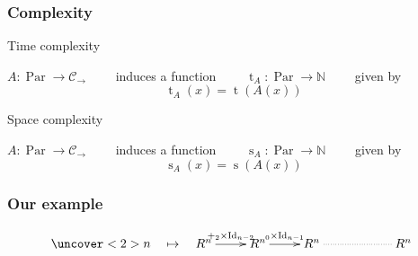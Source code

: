 \documentclass[10pt]{beamer}
\newcommand{\cat}[1]{\mathscr{#1}}
\newcommand{\C}{\cat{C}}
\DeclareMathOperator{\Id}{Id}
\newcommand{\N}{\mathbb{N}}
\newcommand{\ra}{\rightarrow}
\DeclareMathOperator{\Time}{t}
\DeclareMathOperator{\Space}{s}
\DeclareMathOperator{\Par}{Par}
\begin{document}
\begin{frame}
  \frametitle{Complexity}

  \begin{block}{Time complexity}
    \begin{center}
      $A:\Par\ra\C_\ra\qquad$ induces a function
      $\qquad\Time_A:\Par\ra\N\qquad$ given by
      \[\Time_A(x) = \Time(A(x))\]
    \end{center}
  \end{block}

  \begin{block}{Space complexity}
    \begin{center}
      $A:\Par\ra\C_\ra\qquad$ induces a function
      $\qquad\Space_A:\Par\ra\N\qquad$ given by
      \[\Space_A(x) = \Space(A(x))\]
    \end{center}
  \end{block}
\end{frame}



\begin{frame}[fragile]
  \frametitle{Our example}

  \begin{center}
    \begin{minipage}{0.7\textwidth}
\begin{semiverbatim}
\end{semiverbatim}
    \end{minipage}
  \end{center}

  \vfill

  \begin{center}
    \[\uncover<2>{n \quad\mapsto\quad}\xymatrix{
      R^n\ar[r]^{+_2\times{\Id_{n-2}}} & R^n\ar[r]^{\*_0\times{\Id_{n-1}}} &
      R^{n} \ar@{.}[rr] && R^n
    }\]
  \end{center}
\end{frame}
\end{document}
